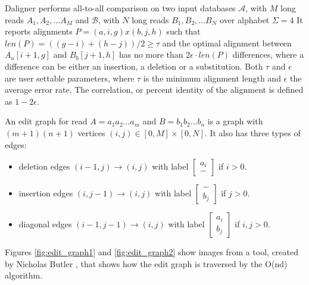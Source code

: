 \documentclass[../main/thesis.tex]{subfiles}
\begin{document}
Daligner performs all-to-all comparison on two input databases $\mathcal{A}$, with $M$ long reads $A_1, A_2,...A_M$ and $\mathcal{B}$, with $N$ long reads $B_1, B_2,...B_N$ over alphabet $\Sigma = 4$
It reports alignments $P = (a,i,g)x(b,j,h)$ such that $len(P) = ((g-i)+(h-j))/2 \ge \tau$ and the optimal alignment between $A_a[i+1,g]$ and $B_b[j+1,h]$ has no more than 2$\epsilon \cdot len(P)$ differences, where a difference can be either an insertion, a deletion or a substitution.
Both $\tau$ and $\epsilon$ are user settable parameters, where $\tau$ is the minimum alignment length and $\epsilon$ the average error rate.
The correlation, or percent identity of the alignment is defined as $1-2\epsilon$.

An edit graph for read $A=a_1a_2...a_m$ and $B=b_1b_2...b_n$ is a graph with $(m+1)(n+1)$ vertices $(i,j) \in [0,M]\times[0,N]$.
It also has three types of edges:
\begin{itemize}
\item deletion edges $(i-1,j) \rightarrow (i,j)$ with label
{\small$\begin{bmatrix}
a_i \\ -
\end{bmatrix}$} if $i > 0$.
\item insertion edges $(i,j-1) \rightarrow (i,j)$ with label 
{\small$\begin{bmatrix}
- \\ b_j
\end{bmatrix}$} if $j > 0$.
\item diagonal edges $(i-1,j-1) \rightarrow (i,j)$ with label
{\small$\begin{bmatrix}
a_i \\ b_j
\end{bmatrix}$} if $i,j > 0$.
\end{itemize}

Figures \ref{fig:edit_graph1} and \ref{fig:edit_graph2} show images from a tool, created by Nicholas Butler \cite{diff_tutorial}, that shows how the edit graph is traversed by the O(nd) algorithm.

\end{document}
